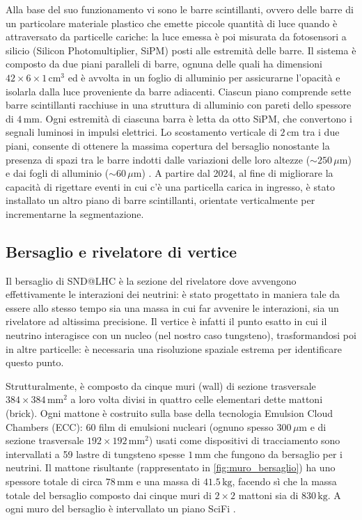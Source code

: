 Alla base del suo funzionamento vi sono le barre scintillanti, ovvero delle barre di un particolare materiale plastico che emette piccole quantità di luce quando è attraversato da particelle cariche: la luce emessa è poi misurata da fotosensori a silicio (Silicon Photomultiplier, SiPM) posti alle estremità delle barre.
Il sistema è composto da due piani paralleli di barre, ognuna delle quali ha dimensioni $42 \times 6 \times 1\,\text{cm}^3$ ed è avvolta in un foglio di alluminio per assicurarne l’opacità e isolarla dalla luce proveniente da barre adiacenti.
Ciascun piano comprende sette barre scintillanti racchiuse in una struttura di alluminio con pareti dello spessore di $4\,\text{mm}$.
Ogni estremità di ciascuna barra è letta da otto SiPM, che convertono i segnali luminosi in impulsi elettrici.
Lo scostamento verticale di $2\,\text{cm}$ tra i due piani, consente di ottenere la massima copertura del bersaglio nonostante la presenza di spazi tra le barre indotti dalle variazioni delle loro altezze ($\sim250\,\mu\text{m}$) e dai fogli di alluminio ($\sim60\,\mu\text{m}$) \cite{Acampora_2024}.
A partire dal 2024, al fine di migliorare la capacità di rigettare eventi in cui c’è una particella carica in ingresso, è stato installato un altro piano di barre scintillanti, orientate verticalmente per incrementarne la segmentazione.

\subsection{Bersaglio e rivelatore di vertice}
Il bersaglio di SND@LHC è la sezione del rivelatore dove avvengono effettivamente le interazioni dei neutrini: è stato progettato in maniera tale da essere allo stesso tempo sia una massa in cui far avvenire le interazioni, sia un rivelatore ad altissima precisione.
Il vertice è infatti il punto esatto in cui il neutrino interagisce con un nucleo (nel nostro caso tungsteno), trasformandosi poi in altre particelle: è necessaria una risoluzione spaziale estrema per identificare questo punto.

Strutturalmente, è composto da cinque muri (wall) di sezione trasversale $384 \times 384 \,\text{mm}^2$ a loro volta divisi in quattro celle elementari dette mattoni (brick).
Ogni mattone è costruito sulla base della tecnologia Emulsion Cloud Chambers (ECC): 60 film di emulsioni nucleari (ognuno spesso $300\,\mu\text{m}$ e di sezione trasversale $192 \times 192 \,\text{mm}^2$) usati come dispositivi di tracciamento sono intervallati a 59 lastre di tungsteno spesse $1 \,\text{mm}$ che fungono da bersaglio per i neutrini.
Il mattone risultante (rappresentato in \cref{fig:muro_bersaglio}) ha uno spessore totale di circa $78\,\text{mm}$ e una massa di $41.5\,\text{kg}$, facendo sì che la massa totale del bersaglio composto dai cinque muri di $2\times2$ mattoni sia di $830\,\text{kg}$.
A ogni muro del bersaglio è intervallato un piano SciFi \cite{Acampora_2024}.

